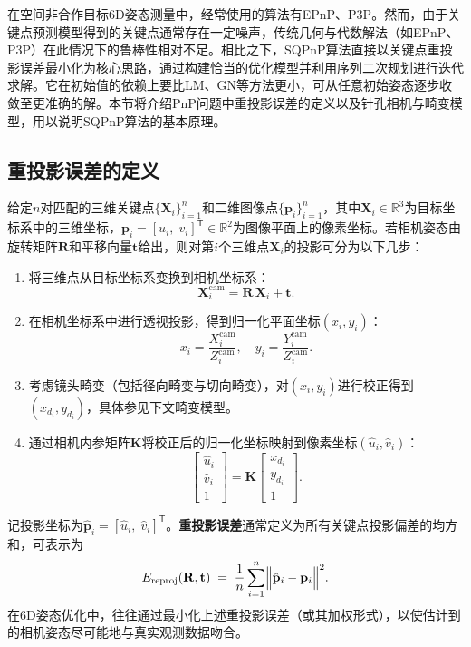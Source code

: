 在空间非合作目标6D姿态测量中，经常使用的算法有EPnP、P3P。然而，由于关键点预测模型得到的关键点通常存在一定噪声，传统几何与代数解法（如EPnP、P3P）在此情况下的鲁棒性相对不足。相比之下，SQPnP算法\cite{terzakis2020consistently}直接以关键点重投影误差最小化为核心思路，通过构建恰当的优化模型并利用序列二次规划进行迭代求解。它在初始值的依赖上要比LM、GN等方法更小，可从任意初始姿态逐步收敛至更准确的解。本节将介绍PnP问题中重投影误差的定义以及针孔相机与畸变模型，用以说明SQPnP算法的基本原理。

\subsection{重投影误差的定义}
给定$n$对匹配的三维关键点$\{\mathbf{X}_i\}_{i=1}^n$和二维图像点$\{\mathbf{p}_i\}_{i=1}^n$，其中$\mathbf{X}_i \in \mathbb{R}^3$为目标坐标系中的三维坐标，$\mathbf{p}_i = [u_i,\;v_i]^\mathsf{T}\in\mathbb{R}^2$为图像平面上的像素坐标。若相机姿态由旋转矩阵$\mathbf{R}$和平移向量$\mathbf{t}$给出，则对第$i$个三维点$\mathbf{X}_i$的投影可分为以下几步：

\begin{enumerate}
	\item 将三维点从目标坐标系变换到相机坐标系：
	\[
	\mathbf{X}_i^{\mathrm{cam}} = \mathbf{R}\,\mathbf{X}_i + \mathbf{t}.
	\]
	\item 在相机坐标系中进行透视投影，得到归一化平面坐标$(x_i, y_i)$：
	\[
	x_i = \frac{X_{i}^{\mathrm{cam}}}{Z_{i}^{\mathrm{cam}}}, \quad
	y_i = \frac{Y_{i}^{\mathrm{cam}}}{Z_{i}^{\mathrm{cam}}}.
	\]
	\item 考虑镜头畸变（包括径向畸变与切向畸变），对$(x_i, y_i)$进行校正得到$(x_{d_i}, y_{d_i})$，具体参见下文畸变模型。
	\item 通过相机内参矩阵$\mathbf{K}$将校正后的归一化坐标映射到像素坐标$(\hat{u}_i, \hat{v}_i)$：
	\[
	\begin{bmatrix}
		\hat{u}_i \\[3pt]
		\hat{v}_i \\[3pt]
		1 
	\end{bmatrix}
	=
	\mathbf{K}
	\begin{bmatrix}
		x_{d_i} \\[3pt]
		y_{d_i} \\[3pt]
		1
	\end{bmatrix}.
	\]
\end{enumerate}

记投影坐标为$\hat{\mathbf{p}}_i = [\hat{u}_i,\;\hat{v}_i]^\mathsf{T}$。\textbf{重投影误差}通常定义为所有关键点投影偏差的均方和，可表示为
\begin{equation}
	E_{\mathrm{reproj}}(\mathbf{R}, \mathbf{t})
	\;=\;
	\frac{1}{n}
	\sum_{i=1}^n 
	\Bigl\|
	\hat{\mathbf{p}}_i - \mathbf{p}_i
	\Bigr\|^2.
	\label{eq:reprojErrDef}
\end{equation}
在6D姿态优化中，往往通过最小化上述重投影误差（或其加权形式），以使估计到的相机姿态尽可能地与真实观测数据吻合。

